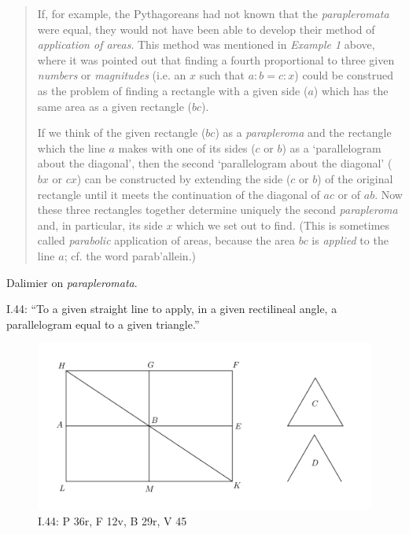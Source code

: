 \documentclass{article}
\newcommand{\Gk}[1]{\selectlanguage{polutonikogreek}#1\selectlanguage{english}}%
\begin{document}
\begin{quote}
If, for example, the Pythagoreans had
not known that the {\em parapleromata} were  equal, they would not have
been able to develop their method of {\em application of areas}. This method
was mentioned in {\em Example 1} above, where it was pointed out that
finding a fourth proportional to three given {\em numbers} or {\em magnitudes} (i.e.
an $x$ such that $a:b=c:x$) could be construed as the problem of
finding a rectangle with a given side ($a$) which has the same area as a
given rectangle ($bc$). 

If we think of the given rectangle
($bc$) as a {\em parapleroma} and the rectangle which the line $a$ makes with
one of its sides ($c$ or $b$) as a `parallelogram about the diagonal', then the
second `parallelogram about the diagonal' ($bx$ or $cx$) can be constructed 
by extending the side ($c$ or $b$) of the original rectangle until it meets the 
continuation of the diagonal of $ac$ or of $ab$. Now these 
three rectangles together determine uniquely the second {\em parapleroma}
and, in particular, its side $x$ which we set out to find. (This is sometimes
called {\em parabolic} application of areas, because the area $bc$ is {\em applied}
to the line $a$; cf. the word \Gk{parab'allein}.)
\end{quote}

Dalimier \cite{dalimier} on {\em parapleromata}.


I.44: ``To a given straight line to apply, in a given rectilineal
angle, a parallelogram equal to a given triangle.''

\begin{figure}
\begin{center}
\includegraphics{I44.png}
\end{center}
\caption{I.44:  P 36r, F 12v, B 29r, V 45}
\label{I44}
\end{figure}
\end{document}
